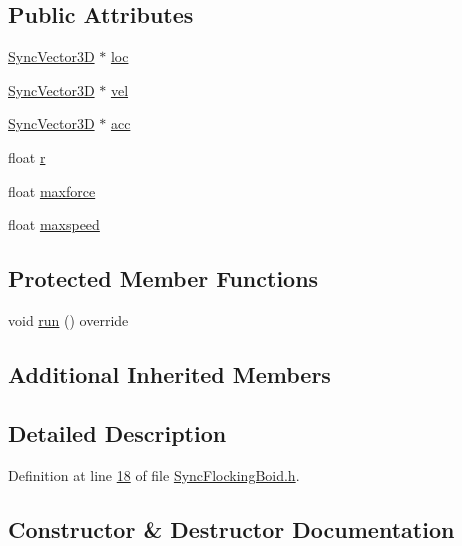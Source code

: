 \subsection*{Public Attributes}
\begin{DoxyCompactItemize}
\item 
\hyperlink{class_sync_vector3_d}{Sync\+Vector3\+D} $\ast$ \hyperlink{class_sync_flocking_boid_a1448999018acaa4ec3117ee2bbee2b02}{loc}
\item 
\hyperlink{class_sync_vector3_d}{Sync\+Vector3\+D} $\ast$ \hyperlink{class_sync_flocking_boid_a1b6cf043598e64ecd40ecd5b75beb01f}{vel}
\item 
\hyperlink{class_sync_vector3_d}{Sync\+Vector3\+D} $\ast$ \hyperlink{class_sync_flocking_boid_ac3bd9015e70a26d8a59d200563a5cf0e}{acc}
\item 
float \hyperlink{class_sync_flocking_boid_ac4386412e74ca67214ad6e1c55eb1525}{r}
\item 
float \hyperlink{class_sync_flocking_boid_add7d9f2bf292a749bd17e730027e7350}{maxforce}
\item 
float \hyperlink{class_sync_flocking_boid_a2dbbbab7d604e28ed779dbe098f9803d}{maxspeed}
\end{DoxyCompactItemize}
\subsection*{Protected Member Functions}
\begin{DoxyCompactItemize}
\item 
void \hyperlink{class_sync_flocking_boid_a5e55737f1391da4454b31c0fcb0311ea}{run} () override
\end{DoxyCompactItemize}
\subsection*{Additional Inherited Members}


\subsection{Detailed Description}


Definition at line \hyperlink{_sync_flocking_boid_8h_source_l00018}{18} of file \hyperlink{_sync_flocking_boid_8h_source}{Sync\+Flocking\+Boid.\+h}.



\subsection{Constructor \& Destructor Documentation}
\hypertarget{class_sync_flocking_boid_a76ceab54bd8eec11f04c11f557f24100}{}
